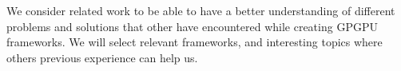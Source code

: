 We consider related work to be able to have a better understanding of different problems and solutions that other have encountered while creating GPGPU frameworks. We will select relevant frameworks, and interesting topics where others previous experience can help us.